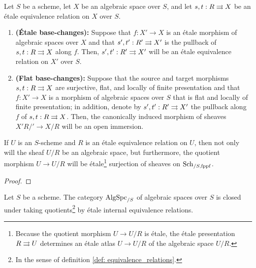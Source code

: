             \begin{proposition} \label{prop: base_changing_etale_and_flat_equivalence_relations_in_algebraic_spaces}
                Let $S$ be a scheme, let $X$ be an algebraic space over $S$, and let $s, t: R \rightrightarrows X$ be an \'etale equivalence relation on $X$ over $S$.
                    \begin{enumerate}
                        \item \textbf{(\'Etale base-changes):} Suppose that $f: X' \to X$ is an \'etale morphism of algebraic spaces over $X$ and that $s', t': R' \rightrightarrows X'$ is the pullback of $s, t: R \rightrightarrows X$ along $f$. Then, $s', t': R' \rightrightarrows X'$ will be an \'etale equivalence relation on $X'$ over $S$.
                        \item \textbf{(Flat base-changes):} Suppose that the source and target morphisms $s, t: R \rightrightarrows X$ are surjective, flat, and locally of finite presentation and that $f: X' \to X$ is a morphism of algebraic spaces over $S$ that is flat and locally of finite presentation; in addition, denote by $s', t': R' \rightrightarrows X'$ the pullback along $f$ of $s, t: R \rightrightarrows X$. Then, the canonically induced morphism of sheaves $X'R/' \to X/R$ will be an open immersion. 
                    \end{enumerate}
            \end{proposition}
            \begin{lemma} \label{lemma: quotients_of_schemes_by_etale_equivalence_relations_are_algebraic_spaces}
                If $U$ is an $S$-scheme and $R$ is an \'etale equivalence relation on $U$, then not only will the sheaf $U/R$ be an algebraic space, but furthermore, the quotient morphism $U \to U/R$ will be \'etale\footnote{Because the quotient morphism $U \to U/R$ is \'etale, the \'etale presentation $R \rightrightarrows U$ determines an \'etale atlas $U \to U/R$ of the algebraic space $U/R$.} surjection of sheaves on $\mathrm{Sch}_{/S, \mathrm{fppf}}$. 
            \end{lemma}
                \begin{proof}
                    
                \end{proof}
            \begin{theorem} \label{prop: quotients_of_algebraic_spaces_by_etale_equivalence_relations_are_algebraic_spaces}
                Let $S$ be a scheme. The category $\mathrm{Alg}\mathrm{Spc}_{/S}$ of algebraic spaces over $S$ is closed under taking quotients\footnote{In the sense of definition \ref{def: equivalence_relations}.} by \'etale internal equivalence relations.
            \end{theorem}
